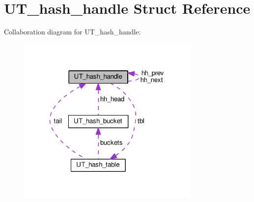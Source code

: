 \hypertarget{struct_u_t__hash__handle}{\section{U\+T\+\_\+hash\+\_\+handle Struct Reference}
\label{struct_u_t__hash__handle}
}


Collaboration diagram for U\+T\+\_\+hash\+\_\+handle\+:\nopagebreak
\begin{figure}[H]
\begin{center}
\leavevmode
\includegraphics[width=255pt]{struct_u_t__hash__handle__coll__graph}
\end{center}
\end{figure}
